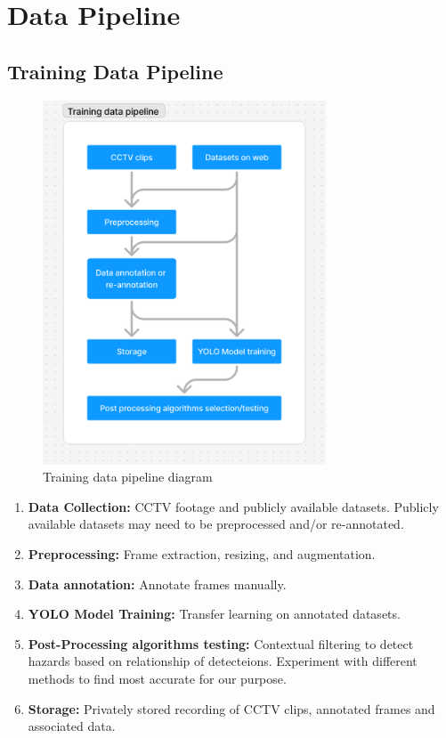 \documentclass[12pt]{article}
\begin{document}
\section{Data Pipeline}
\subsection{Training Data Pipeline}
\begin{figure}[H]
    \centering
    \includegraphics[width=0.75\textwidth]{training_pipeline.png}
    \caption{Training data pipeline diagram}
    \label{fig:pipeline1}
\end{figure}

\begin{enumerate}
    \item \textbf{Data Collection:} CCTV footage and publicly available datasets. Publicly available datasets may need to be preprocessed and/or re-annotated.
    \item \textbf{Preprocessing:} Frame extraction, resizing, and augmentation.
    \item \textbf{Data annotation:} Annotate frames manually.
    \item \textbf{YOLO Model Training:} Transfer learning on annotated datasets.    
    \item \textbf{Post-Processing algorithms testing:} Contextual filtering to detect hazards based on relationship of detecteions. Experiment with different methods to find most accurate for our purpose.
    \item \textbf{Storage:} Privately stored recording of CCTV clips, annotated frames and associated data.
\end{enumerate}
\end{document}
